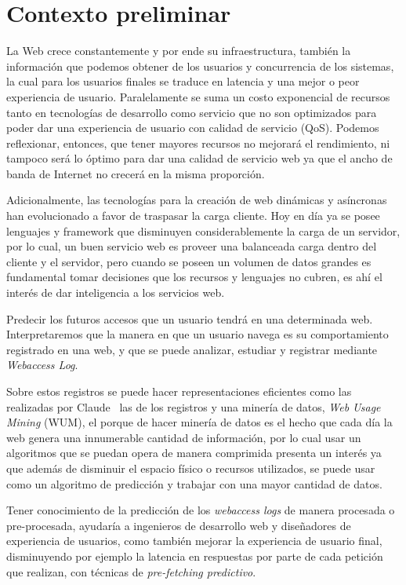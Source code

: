 \section{Contexto preliminar} 
\label{sec:preliminar}


  La Web crece constantemente y por ende su infraestructura, también la información que podemos obtener de los  usuarios y  concurrencia de los sistemas, la cual para los usuarios finales se traduce en latencia y una mejor o peor experiencia de usuario. Paralelamente se suma un costo exponencial de recursos tanto en tecnologías de desarrollo como servicio que no son optimizados para poder dar una experiencia de usuario con calidad de servicio (QoS). Podemos reflexionar, entonces, que tener mayores recursos no mejorará el rendimiento, ni tampoco será lo óptimo para dar una calidad de servicio web ya que el ancho de banda de Internet no crecerá en la misma proporción.
   
  Adicionalmente, las tecnologías para la creación de web dinámicas y asíncronas han evolucionado a favor de traspasar la carga cliente.
  Hoy en día ya se posee lenguajes y framework que disminuyen considerablemente la carga de un servidor, por lo cual, un buen servicio web es proveer una balanceada carga dentro del cliente y el servidor, pero cuando se poseen un volumen de datos grandes es fundamental tomar decisiones que los recursos y lenguajes no cubren, es ahí el interés de dar inteligencia a los servicios web.

  Predecir los futuros accesos que un usuario tendrá en una determinada web. Interpretaremos que la manera en que un usuario navega es su comportamiento registrado en una web, y que se puede analizar, estudiar y registrar mediante \emph{Webaccess Log}. 

  Sobre estos registros se puede hacer representaciones eficientes como las realizadas por Claude\etal~\cite{Claude2014} las de los registros y una minería de datos, \emph{Web Usage Mining} (WUM), el porque de hacer minería de datos es el hecho que cada día la web genera una innumerable cantidad de información, por lo cual usar un algoritmos que se puedan opera de manera comprimida presenta un interés ya que además de disminuir el espacio físico o recursos utilizados, se puede usar como un algoritmo de predicción y trabajar con una mayor cantidad de datos.
  
  Tener conocimiento de la predicción de los \emph{webaccess logs} de manera procesada o pre-procesada, ayudaría a ingenieros de desarrollo web y diseñadores de experiencia de usuarios, como también mejorar la experiencia de usuario final, disminuyendo por ejemplo la latencia en respuestas por parte de cada petición que realizan, con técnicas de \emph{pre-fetching predictivo}.
  


